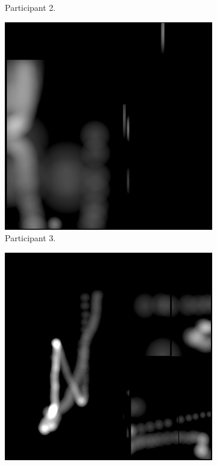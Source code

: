 \begin{figure}[!ht]
\begin{subfigure}[b]{0.24\textwidth}
        \caption{Participant 2.}
    \end{subfigure}
    \hfill
    \begin{subfigure}[b]{0.24\textwidth}
        \centering
        \includegraphics[width=\textwidth]{img/data/Panel17/single/3.png}
        \caption{Participant 3.}
    \end{subfigure}
    \hfill
    \begin{subfigure}[b]{0.24\textwidth}
        \centering
        \includegraphics[width=\textwidth]{img/data/Panel17/single/4.png}

\end{subfigure}
\end{figure}
